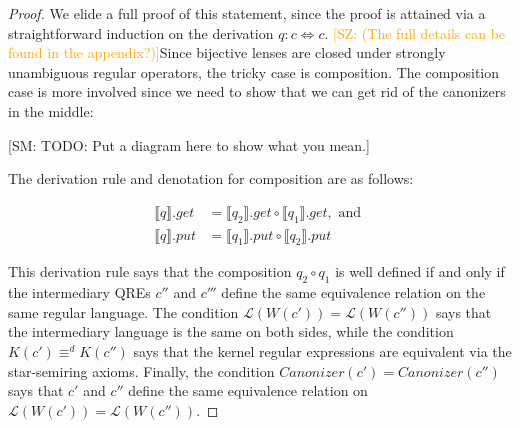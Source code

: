 \documentclass{svproc}
\newcommand{\FINISH}[3]{\ifdraft\textcolor{#1}{[#2: #3]}\fi}
\newcommand{\saz}[1]{\FINISH{orange}{SZ}{#1}}
\newcommand{\sam}[1]{\FINISH{dkpurple}{SM}{#1}}
\begin{document}
\begin{proof} 
We elide a full proof of this statement, since the proof is attained via a
straightforward induction on the derivation $q : c \Leftrightarrow c$. \saz{(The
  full details can be found in the appendix?)}Since
bijective lenses are closed under strongly unambiguous regular operators, the
tricky case is composition. The composition case is more involved since we need
to show that we can get rid of the canonizers in the middle:

\sam{TODO: Put a diagram here to show what you mean.}

The derivation rule and denotation for composition are as follows:
  \begin{prooftree}
\end{prooftree}

\begin{align*}
  \llbracket q \rrbracket.get &= \llbracket q_2 \rrbracket.get\circ \llbracket
  q_1 \rrbracket.get, \text{ and }\\
  \llbracket q \rrbracket.put &= \llbracket q_1 \rrbracket.put \circ \llbracket
  q_2 \rrbracket.put
  \end{align*}
  
This derivation rule says that the composition $q_2 \circ q_1$ is well defined
if and only if the intermediary QREs $c''$ and $c'''$ define the same
equivalence relation on the same regular language. The condition
$\mathcal{L}(W(c')) = \mathcal{L}(W(c''))$ says that the intermediary language
is the same on both sides, while the condition $K(c') \equiv^d K(c'')$ says that
the kernel regular expressions are equivalent via the star-semiring axioms.
Finally, the condition $\mathit{Canonizer}(c') = \mathit{Canonizer}(c'')$ says
that $c'$ and $c''$ define the same equivalence relation on $\mathcal{L}(W(c'))=
\mathcal{L}(W(c''))$.


\end{proof}
\end{document}
